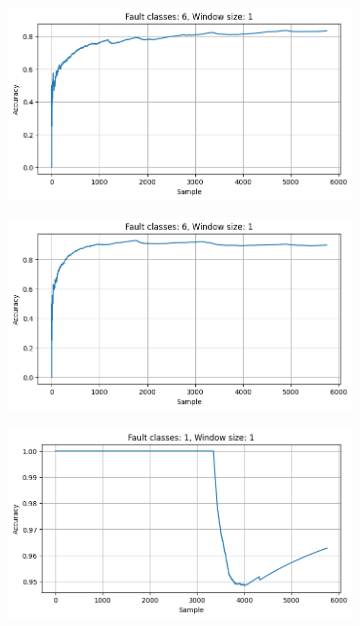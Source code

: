 \begin{figure}[ht]
    \centering
    \begin{subfigure}[b]{0.49\textwidth}
        \includegraphics[width=\textwidth]{assets/design/gradual-learning-temporal-domain-fault.png}
        \caption{}
    \end{subfigure}
    \hfill
    \begin{subfigure}[b]{0.49\textwidth}
        \includegraphics[width=\textwidth]{assets/design/gradual-learning-spectral-domain-fault.png}
        \caption{}
    \end{subfigure}
    \begin{subfigure}[b]{0.49\textwidth}
        \includegraphics[width=\textwidth]{assets/design/gradual-learning-temporal-domain-anomaly60.png}

\end{subfigure}
\end{figure}
